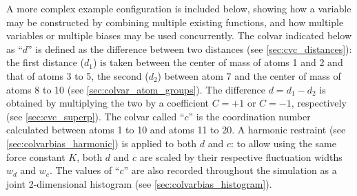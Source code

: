 A more complex example configuration is included below, showing how a variable may be constructed by combining multiple existing functions, and how multiple variables or multiple biases may be used concurrently.
The colvar indicated below as ``$d$'' is defined as the difference between two distances (see \ref{sec:cvc_distances}): the first distance ($d_{1}$) is taken between the center of mass of atoms 1 and 2 and that of atoms 3 to 5, the second ($d_{2}$) between atom 7 and the center of mass of atoms 8 to 10 (see \ref{sec:colvar_atom_groups}).
The difference $d = d_{1} - d_{2}$ is obtained by multiplying the two by a coefficient $C = +1$ or $C = -1$, respectively (see \ref{sec:cvc_superp}).
The colvar called ``$c$'' is the coordination number calculated between atoms 1 to 10 and atoms 11 to 20.  A harmonic restraint (see \ref{sec:colvarbias_harmonic}) is applied to both $d$ and $c$: to allow using the same force constant $K$, both $d$ and $c$ are scaled by their respective fluctuation widths $w_d$ and $w_c$.
The values of ``$c$'' are also recorded throughout the simulation as a joint 2-dimensional histogram (see \ref{sec:colvarbias_histogram}).


